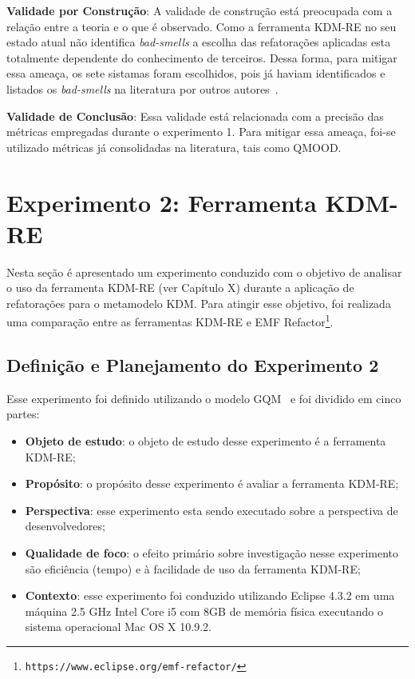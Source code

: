 \textbf{Validade por Construção}: A validade de construção está preocupada com a relação entre a teoria e o que é observado. Como a ferramenta KDM-RE no seu estado atual não identifica \textit{bad-smells} a escolha das refatorações aplicadas esta totalmente dependente do conhecimento de terceiros. Dessa forma, para mitigar essa ameaça, os sete sistamas foram escolhidos, pois já haviam identificados e listados os \textit{bad-smells} na literatura por outros autores~\cite{Kessentini_2011, Ouni_2013, Moha_2010, Kessentini_2010}.

\textbf{Validade de Conclusão}: Essa validade está relacionada com a precisão das métricas empregadas durante o experimento 1. Para mitigar essa ameaça, foi-se utilizado métricas já consolidadas na literatura, tais como QMOOD. 


\section{Experimento 2: Ferramenta KDM-RE}\label{sec:experimento_KDM_re}

Nesta seção é apresentado um experimento conduzido com o objetivo de analisar o uso da ferramenta KDM-RE (ver Capítulo X) durante a aplicação de refatorações para o metamodelo KDM. Para atingir esse objetivo, foi realizada uma comparação entre as ferramentas KDM-RE e EMF Refactor\footnote{\texttt{https://www.eclipse.org/emf-refactor/}}.

\subsection{Definição e Planejamento do Experimento 2}

Esse experimento foi definido utilizando o modelo GQM~\cite{Wohlin} e foi dividido em cinco partes:

\begin{itemize}
\item \textbf{Objeto de estudo}: o objeto de estudo desse experimento é a ferramenta KDM-RE;
\item \textbf{Propósito}: o propósito desse experimento é avaliar a ferramenta KDM-RE;
\item \textbf{Perspectiva}: esse experimento esta sendo executado sobre a perspectiva de desenvolvedores;
\item \textbf{Qualidade de foco}: o efeito primário sobre investigação nesse experimento são eficiência (tempo) e à facilidade de uso da ferramenta KDM-RE;
\item \textbf{Contexto}: esse experimento foi conduzido utilizando Eclipse 4.3.2 em uma máquina 2.5 GHz Intel Core i5 com 8GB de memória física executando o sistema operacional Mac OS X 10.9.2.
\end{itemize}

